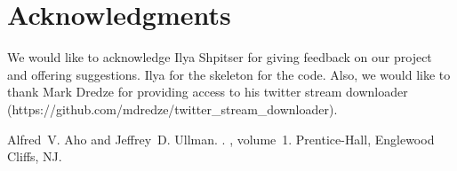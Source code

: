\documentclass[11pt,letterpaper]{article}
\begin{document}
\section*{Acknowledgments}
We would like to acknowledge Ilya Shpitser for giving feedback on our project and offering suggestions. Ilya for the skeleton for the code.
Also, we would like to thank Mark Dredze for providing access to his twitter stream downloader (https://github.com/mdredze/twitter_stream_downloader).

\begin{thebibliography}{}

Alfred~V. Aho and Jeffrey~D. Ullman.
.
, volume~1.
\newblock Prentice-{Hall}, Englewood Cliffs, NJ.

\end{thebibliography}
\end{document}
